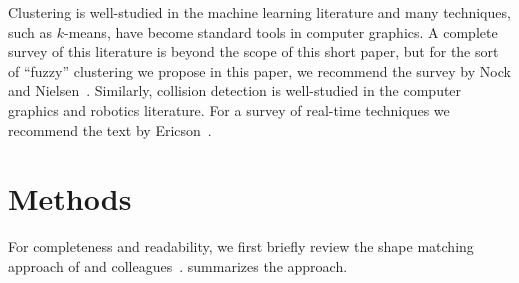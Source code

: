 \documentclass[review]{acmsiggraph}
\begin{document}
Clustering is well-studied in the machine learning literature and many techniques, such as $k$-means, have become standard tools in computer graphics.  
A complete survey of this literature is beyond the scope of this short paper, but for the sort of ``fuzzy'' clustering we propose in this paper,
we recommend the survey by Nock and Nielsen~.  Similarly, collision detection is well-studied in the 
computer graphics and robotics literature.  For a survey of real-time techniques we recommend the text by Ericson~.

\section{Methods}
For completeness and readability, we first briefly review the shape matching approach of \Mueller and colleagues~.   summarizes the approach.  
\end{document}
